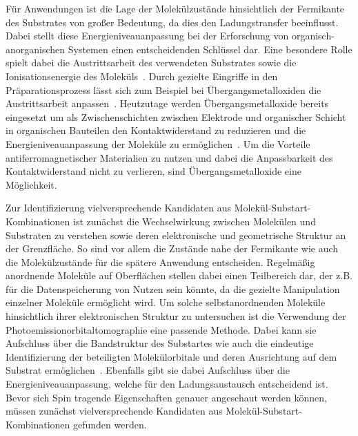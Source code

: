     Für Anwendungen ist die Lage der Molekülzustände hinsichtlich der Fermikante des Substrates von großer Bedeutung, da dies den Ladungstransfer beeinflusst.
    Dabei stellt diese Energieniveauanpassung bei der Erforschung von organisch-anorganischen Systemen einen entscheidenden Schlüssel dar.
    Eine besondere Rolle spielt dabei die Austrittsarbeit des verwendeten Substrates sowie die Ionisationsenergie des Moleküls~\cite{5A_3}.
    Durch gezielte Eingriffe in den Präparationsprozess lässt sich zum Beispiel bei Übergangsmetalloxiden die Austrittsarbeit anpassen~\cite{5A_4}.
    Heutzutage werden Übergangsmetalloxide bereits eingesetzt um als Zwischenschichten zwischen Elektrode und organischer Schicht in organischen Bauteilen den Kontaktwiderstand zu reduzieren und die Energieniveauanpassung der Moleküle zu ermöglichen~\cite{IF_11}.
    Um die Vorteile antiferromagnetischer Materialien zu nutzen und dabei die Anpassbarkeit des Kontaktwiderstand nicht zu verlieren, sind Übergangsmetalloxide eine Möglichkeit.

    Zur Identifizierung vielversprechende Kandidaten aus Molekül-Substart-Kombinationen ist zunächst die Wechselwirkung zwischen Molekülen und Substraten zu verstehen sowie deren elektronische und geometrische Struktur an der Grenzfläche.
    So sind vor allem die Zustände nahe der Fermikante wie auch die Molekülzustände für die spätere Anwendung entscheiden.
    Regelmäßig anordnende Moleküle auf Oberflächen stellen dabei einen Teilbereich dar, der z.B. für die Datenspeicherung von Nutzen sein könnte, da die gezielte Manipulation einzelner Moleküle ermöglicht wird.
    Um solche selbstanordnenden Moleküle hinsichtlich ihrer elektronischen Struktur zu untersuchen ist die Verwendung der Photoemissionorbitaltomographie eine passende Methode.
    Dabei kann sie Aufschluss über die Bandstruktur des Substartes wie auch die eindeutige Identifizierung der beteiligten Molekülorbitale und deren Ausrichtung auf dem Substrat ermöglichen~\cite{MM_2, MM_5}.
    Ebenfalls gibt sie dabei Aufschluss über die Energieniveauanpassung, welche für den Ladungsaustausch entscheidend ist.
    Bevor sich Spin tragende Eigenschaften genauer angeschaut werden können, müssen zunächst vielversprechende Kandidaten aus Molekül-Substart-Kombinationen gefunden werden.

